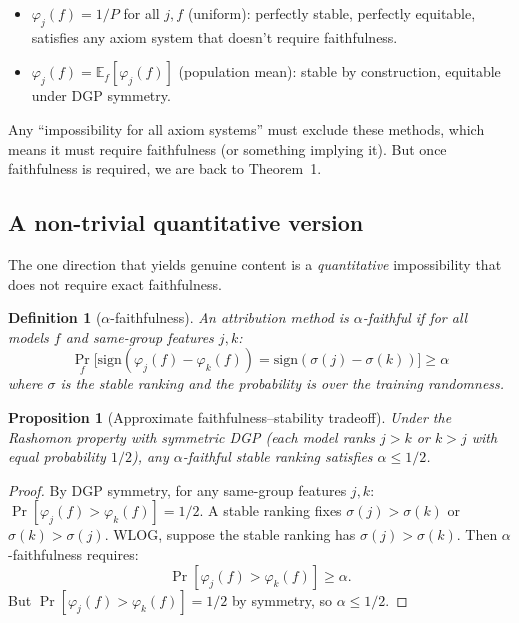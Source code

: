 \documentclass{article}
\newtheorem{proposition}[theorem]{Proposition}
\newtheorem{definition}[theorem]{Definition}
\begin{document}
\begin{itemize}
    \item $\varphi_j(f) = 1/P$ for all $j, f$ (uniform):
      perfectly stable, perfectly equitable, satisfies any
      axiom system that doesn't require faithfulness.
    \item $\varphi_j(f) = \mathbb{E}_f[\varphi_j(f)]$ (population mean):
      stable by construction, equitable under DGP symmetry.
\end{itemize}

Any ``impossibility for all axiom systems'' must exclude these
methods, which means it must require faithfulness (or something
implying it). But once faithfulness is required, we are back to
Theorem~1.

\subsection{A non-trivial quantitative version}

The one direction that yields genuine content is a
\emph{quantitative} impossibility that does not require exact
faithfulness.

\begin{definition}[$\alpha$-faithfulness]
An attribution method is \emph{$\alpha$-faithful} if for all
models $f$ and same-group features $j, k$:
\[
    \Pr_{f}\!\big[\text{sign}(\varphi_j(f) - \varphi_k(f)) =
    \text{sign}(\sigma(j) - \sigma(k))\big] \geq \alpha
\]
where $\sigma$ is the stable ranking and the probability is over
the training randomness.
\end{definition}

\begin{proposition}[Approximate faithfulness--stability tradeoff]
\label{prop:approx-tradeoff}
Under the Rashomon property with symmetric DGP (each model
ranks $j > k$ or $k > j$ with equal probability $1/2$), any
$\alpha$-faithful stable ranking satisfies $\alpha \leq 1/2$.
\end{proposition}

\begin{proof}
By DGP symmetry, for any same-group features $j, k$:
$\Pr[\varphi_j(f) > \varphi_k(f)] = 1/2$.
A stable ranking fixes $\sigma(j) > \sigma(k)$ or
$\sigma(k) > \sigma(j)$.
WLOG, suppose the stable ranking has $\sigma(j) > \sigma(k)$.
Then $\alpha$-faithfulness requires:
\[
    \Pr[\varphi_j(f) > \varphi_k(f)] \geq \alpha.
\]
But $\Pr[\varphi_j(f) > \varphi_k(f)] = 1/2$ by symmetry, so
$\alpha \leq 1/2$.
\end{proof}
\end{document}
